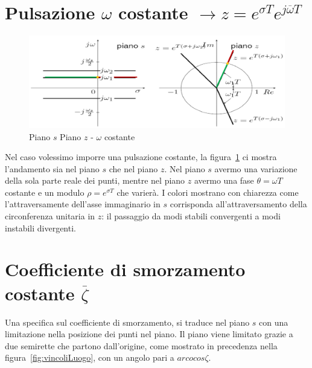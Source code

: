 \documentclass[a4paper]{report}
\begin{document}
\section{Pulsazione $\omega$ costante $\rightarrow z = e^{\sigma T}
  e^{j \overline{\omega} T}$}
\begin{figure}[!h]
  \begin{center}
    \includegraphics[scale=0.3]{./figures/pianoSomegaCostante.png}
    \caption{Piano $s$ Piano $z$ - $\omega$
      costante}\label{fig:pianoSomegaCostante}
  \end{center}
\end{figure}
Nel caso volessimo imporre una pulsazione costante, la
figura~\ref{fig:pianoSomegaCostante} ci mostra l'andamento sia nel
piano $s$ che nel piano $z$. Nel piano $s$ avermo una variazione della
sola parte reale dei punti, mentre nel piano $z$ avermo una fase
$\theta = \omega T$ costante e un modulo $\rho = e^{\sigma T}$ che
varier\`a. I colori mostrano con chiarezza come l'attraversamente
dell'asse immaginario in $s$ corrisponda all'attraversamento della
circonferenza unitaria in $z$: il passaggio da modi stabili
convergenti a modi instabili divergenti.

\section{Coefficiente di smorzamento costante $\overline{\zeta}$}
Una specifica sul coefficiente di smorzamento, si traduce nel piano
$s$ con una limitazione nella posizione dei punti nel piano. Il piano
viene limitato grazie a due semirette che partono dall'origine, come
mostrato in precedenza nella figura~\ref{fig:vincoliLuogo}, con un
angolo pari a $arcocos \zeta$.
\end{document}
